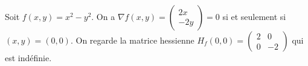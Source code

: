 \begin{example}
Soit $f(x,y)=x^{2}-y^{2}$. On a $\nabla f(x,y)=\begin{pmatrix}2x \\ -2y\end{pmatrix}=0$ si et seulement si $(x,y)=(0,0)$. On regarde la matrice hessienne $H_{f}(0,0)=\begin{pmatrix}2 & 0 \\ 0 & -2\end{pmatrix}$ qui est indéfinie. 
\end{example}


